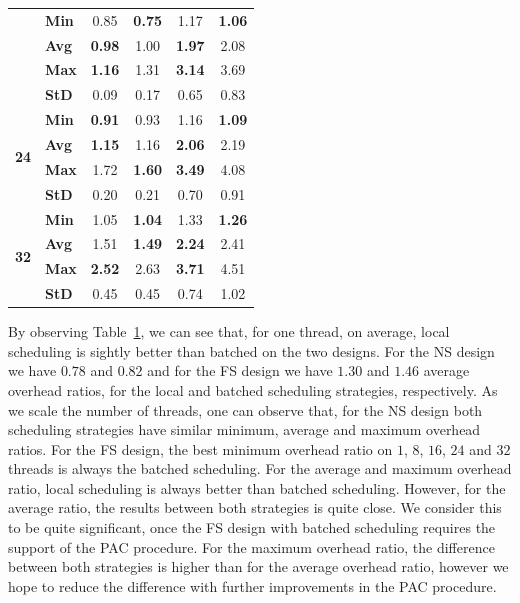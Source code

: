 \documentclass{llncs}
\begin{document}
\begin{table}[!ht]
\begin{tabular}{ll|cc|cc}
& {\bf Min }& 0.85& {\bf 0.75}& 1.17& {\bf 1.06}\\
& {\bf Avg }& {\bf 0.98}& 1.00& {\bf 1.97}& 2.08\\
& {\bf Max }& {\bf 1.16}& 1.31& {\bf 3.14}& 3.69\\
& {\bf StD }& 0.09& 0.17& 0.65& 0.83\\
\hline
\multirow{4}{*}{\bf 24}
& {\bf Min }& {\bf 0.91}& 0.93& 1.16& {\bf 1.09}\\
& {\bf Avg }& {\bf 1.15}& 1.16& {\bf 2.06}& 2.19\\
& {\bf Max }& 1.72& {\bf 1.60}& {\bf 3.49}& 4.08\\
& {\bf StD }& 0.20& 0.21& 0.70& 0.91\\
\hline
\multirow{4}{*}{\bf 32}
& {\bf Min }& 1.05& {\bf 1.04}& 1.33& {\bf 1.26}\\
& {\bf Avg }& 1.51& {\bf 1.49}& {\bf 2.24}& 2.41\\
& {\bf Max }& {\bf 2.52}& 2.63& {\bf 3.71}& 4.51\\
& {\bf StD }& 0.45& 0.45& 0.74& 1.02\\
\hline\hline
\end{tabular}%
\label{tab_batched_overhead}
\vspace{-0.7\intextsep}
\end{table}

By observing Table~\ref{tab_batched_overhead}, we can see that, for
one thread, on average, local scheduling is sightly better than
batched on the two designs. For the NS design we have $0.78$ and
$0.82$ and for the FS design we have $1.30$ and $1.46$ average
overhead ratios, for the local and batched scheduling strategies,
respectively. As we scale the number of threads, one can observe that,
for the NS design both scheduling strategies have similar minimum,
average and maximum overhead ratios. For the FS design, the best
minimum overhead ratio on $1$, $8$, $16$, $24$ and $32$ threads is
always the batched scheduling. For the average and maximum overhead
ratio, local scheduling is always better than batched
scheduling. However, for the average ratio, the results between both
strategies is quite close. We consider this to be quite significant,
once the FS design with batched scheduling requires the support of the
PAC procedure. For the maximum overhead ratio, the difference between
both strategies is higher than for the average overhead ratio, however
we hope to reduce the difference with further improvements in the PAC
procedure.

\end{document}
